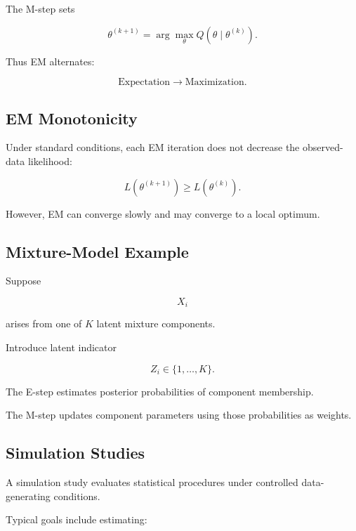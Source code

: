 The M-step sets

\[
\boxed{
\theta^{(k+1)}
=
\arg\max_\theta
Q
(
\theta\mid\theta^{(k)}
).
}
\]

Thus EM alternates:

\[
\boxed{
\text{Expectation}
\rightarrow
\text{Maximization}.
}
\]

\subsection{EM Monotonicity}
\label{subsec:em-monotonicity}

Under standard conditions, each EM iteration does not decrease the
observed-data likelihood:

\[
\boxed{
L
(
\theta^{(k+1)}
)
\geq
L
(
\theta^{(k)}
).
}
\]

However, EM can converge slowly and may converge to a local optimum.

\subsection{Mixture-Model Example}
\label{subsec:em-mixture-model}

Suppose

\[
X_i
\]

arises from one of \(K\) latent mixture components.

Introduce latent indicator

\[
\boxed{
Z_i
\in
\{1,\ldots,K\}.
}
\]

The E-step estimates posterior probabilities of component membership.

The M-step updates component parameters using those probabilities as
weights.

\subsection{Simulation Studies}
\label{subsec:simulation-studies}

A simulation study evaluates statistical procedures under controlled
data-generating conditions.

Typical goals include estimating:

